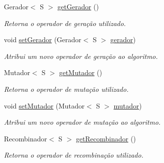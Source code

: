 \begin{DoxyCompactItemize}
Gerador$<$ S $>$ \hyperlink{classic_1_1populacional_1_1algoritmo_1_1_algoritmo_evolucionario_3_01_g_01extends_01_number_00_0bd52af860edf752f8985460efb0aa102_aac3e01f19cb78cfc69f1212fb9965c6d}{get\-Gerador} ()
\begin{DoxyCompactList}\small\item\em Retorna o operador de geração utilizado. \end{DoxyCompactList}\item 
void \hyperlink{classic_1_1populacional_1_1algoritmo_1_1_algoritmo_evolucionario_3_01_g_01extends_01_number_00_0bd52af860edf752f8985460efb0aa102_a406d4a36808a9f143b59edef5256b720}{set\-Gerador} (Gerador$<$ S $>$ \hyperlink{classic_1_1populacional_1_1algoritmo_1_1_algoritmo_evolucionario_3_01_g_01extends_01_number_00_0bd52af860edf752f8985460efb0aa102_af58da64da3d77669b0ce6dba529eb109}{gerador})
\begin{DoxyCompactList}\small\item\em Atribui um novo operador de geração ao algoritmo. \end{DoxyCompactList}\item 
Mutador$<$ S $>$ \hyperlink{classic_1_1populacional_1_1algoritmo_1_1_algoritmo_evolucionario_3_01_g_01extends_01_number_00_0bd52af860edf752f8985460efb0aa102_a02dab65c830b3612bf7b551b9303d539}{get\-Mutador} ()
\begin{DoxyCompactList}\small\item\em Retorna o operador de mutação utilizado. \end{DoxyCompactList}\item 
void \hyperlink{classic_1_1populacional_1_1algoritmo_1_1_algoritmo_evolucionario_3_01_g_01extends_01_number_00_0bd52af860edf752f8985460efb0aa102_a925ccb23537df330b998f518d037c7f9}{set\-Mutador} (Mutador$<$ S $>$ \hyperlink{classic_1_1populacional_1_1algoritmo_1_1_algoritmo_evolucionario_3_01_g_01extends_01_number_00_0bd52af860edf752f8985460efb0aa102_a33ed28eb56f079a635b7746c071bdb65}{mutador})
\begin{DoxyCompactList}\small\item\em Atribui um novo operador de mutação ao algoritmo. \end{DoxyCompactList}\item 
Recombinador$<$ S $>$ \hyperlink{classic_1_1populacional_1_1algoritmo_1_1_algoritmo_evolucionario_3_01_g_01extends_01_number_00_0bd52af860edf752f8985460efb0aa102_a4d1d5482078725b5ddb1dc49f0372d6b}{get\-Recombinador} ()
\begin{DoxyCompactList}\small\item\em Retorna o operador de recombinação utilizado. \end{DoxyCompactList}\item 

\end{DoxyCompactItemize}
